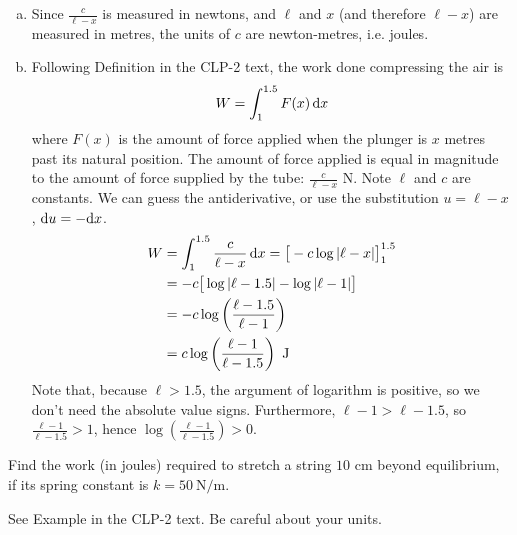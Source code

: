 \begin{solution}
\begin{enumerate}[(a)]
\item Since $\frac{c}{\ell-x}$ is measured in newtons, and $\ell$ and $x$ (and therefore $\ell-x$) are measured in metres, the units of $c$ are newton-metres, i.e. joules.
\item Following Definition  in the CLP-2 text, the work done compressing the air is
\[W = \int_1^{1.5}F(x)\,\mathrm{d}x\]
where $F(x)$ is the amount of force applied when the plunger is $x$ metres past its natural position. The amount of force applied is equal in magnitude to the amount of force supplied by the tube: $\frac{c}{\ell-x}$ N. Note $\ell$ and $c$ are constants. We can guess the antiderivative, or use the substitution $u=\ell-x$, $\mathrm{d}u=-\mathrm{d}x$.
\begin{align*}
W &=\int_1^{1.5} \frac{c}{\ell-x}\,\mathrm{d}x  = \big[-c\log|\ell-x|\big]_1^{1.5}\\
&=-c\big[\log|\ell-1.5| - \log|\ell-1|\big]\\
&=-c\log\left(\frac{\ell-1.5}{\ell-1}\right)\\
&=c\log\left(\frac{\ell-1}{\ell-1.5}\right)\text{ J}\end{align*}
Note that, because $\ell>1.5$, the argument of logarithm is positive, so we don't need the absolute value signs. Furthermore, $\ell-1 > \ell-1.5$, so $\frac{\ell-1}{\ell-1.5}>1$, hence $\log\left(\frac{\ell-1}{\ell-1.5}\right)>0$.
\end{enumerate}
\end{solution}





\begin{question}[2016Q3]\label{prob_s2.1:normal1}
Find the work (in joules) required to stretch a string $10$ cm beyond
equilibrium, if its spring constant is $k=50\ \mathrm{N}/\mathrm{m}$.
\end{question}

\begin{hint}
See Example  in the
CLP-2 text. Be careful about your units.
\end{hint}

